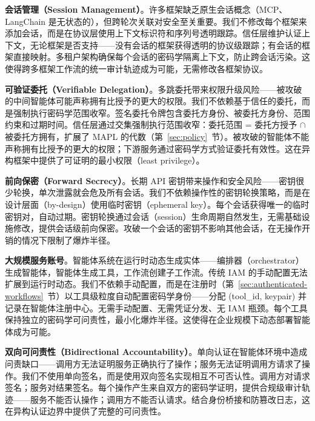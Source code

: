 \textbf{会话管理（Session Management）}。许多框架缺乏原生会话概念（MCP、LangChain 是无状态的），但跨轮次关联对安全至关重要。我们不修改每个框架来添加会话，而是在协议层使用上下文标识符和序列号透明跟踪。信任层维护认证上下文，无论框架是否支持——没有会话的框架获得透明的协议级跟踪；有会话的框架直接映射。多租户架构确保每个会话的密码学隔离上下文，防止跨会话污染。这使得跨多框架工作流的统一审计轨迹成为可能，无需修改各框架协议。

\textbf{可验证委托（Verifiable Delegation）}。多跳委托带来权限升级风险——被攻破的中间智能体可能声称拥有比授予的更大的权限。我们不依赖基于信任的委托，而是强制执行密码学范围收窄。签名委托令牌包含委托方身份、被委托方身份、范围约束和过期时间。信任层通过交集强制执行范围收窄：委托范围 = 委托方授予 $\cap$ 被委托方拥有，扩展了 MAPL 的代数（第~\ref{sec:policy}~节）。被攻破的智能体不能声称拥有比授予的更大的权限；下游服务通过密码学方式验证委托有效性。这在异构框架中提供了可证明的最小权限（least privilege）。

\textbf{前向保密（Forward Secrecy）}。长期 API 密钥带来操作和安全风险——密钥很少轮换，单次泄露就会危及所有会话。我们不依赖操作性的密钥轮换策略，而是在设计层面（by-design）使用临时密钥（ephemeral key）。每个会话获得唯一的临时密钥对，自动过期。密钥轮换通过会话（session）生命周期自然发生，无需基础设施修改，提供会话级前向保密。攻破一个会话的密钥不影响其他会话，在无操作开销的情况下限制了爆炸半径。

\textbf{大规模服务账号}。智能体系统在运行时动态生成实体——编排器（orchestrator）生成智能体，智能体生成工具，工作流创建子工作流。传统 IAM 的手动配置无法扩展到运行时动态。我们不依赖手动配置，而是在注册时（第~\ref{sec:authenticated-workflows}~节）以工具级粒度自动配置密码学身份——分配 (tool\_id, keypair) 并记录在智能体注册中心。无需手动配置、无需凭证分发、无 IAM 瓶颈。每个工具保持独立的密码学可问责性，最小化爆炸半径。这使得在企业规模下动态部署智能体成为可能。

\textbf{双向可问责性（Bidirectional Accountability）}。单向认证在智能体环境中造成问责缺口——调用方无法证明服务正确执行了操作；服务无法证明调用方请求了操作。我们不使用单向签名，而是使用双向签名实现相互不可否认性。调用方对请求签名；服务对结果签名。每个操作产生来自双方的密码学证明，提供合规级审计轨迹——服务不能否认操作；调用方不能否认请求。结合身份桥接和防篡改日志，这在异构认证边界中提供了完整的可问责性。
